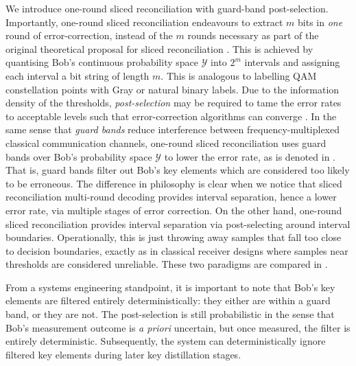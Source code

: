 ﻿\documentclass[12pt]{article}
\begin{document}
We introduce one-round sliced reconciliation with guard-band post-selection. Importantly, one-round sliced reconciliation endeavours to extract $m$ bits in \textit{one} round of error-correction, instead of the $m$ rounds necessary as part of the original theoretical proposal for sliced reconciliation \cite{VanAssche-2004}. This is achieved by quantising Bob's continuous probability space $\mathcal{Y}$ into $2^m$ intervals and assigning each interval a bit string of length $m$. This is analogous to labelling QAM constellation points with Gray or natural binary labels. Due to the information density of the thresholds, \textit{post-selection} may be required to tame the error rates to acceptable levels such that error-correction algorithms can converge \cite{Weerasinghe-2023}. In the same sense that \textit{guard bands} reduce interference between frequency-multiplexed classical communication channels, one-round sliced reconciliation uses guard bands over Bob's probability space $\mathcal{Y}$ to lower the error rate, as is denoted in . That is, guard bands filter out Bob's key elements which are considered too likely to be erroneous. The difference in philosophy is clear when we notice that sliced reconciliation multi-round decoding provides interval separation, hence a lower error rate, via multiple stages of error correction. On the other hand, one-round sliced reconciliation provides interval separation via post-selecting around interval boundaries. Operationally, this is just throwing away samples that fall too close to decision boundaries, exactly as in classical receiver designs where samples near thresholds are considered unreliable. These two paradigms are compared in .

From a systems engineering standpoint, it is important to note that Bob's key elements are filtered entirely deterministically: they either are within a guard band, or they are not. The post-selection is still probabilistic in the sense that Bob's measurement outcome is \textit{a priori} uncertain, but once measured, the filter is entirely deterministic. Subsequently, the system can deterministically ignore filtered key elements during later key distillation stages.
\end{document}
